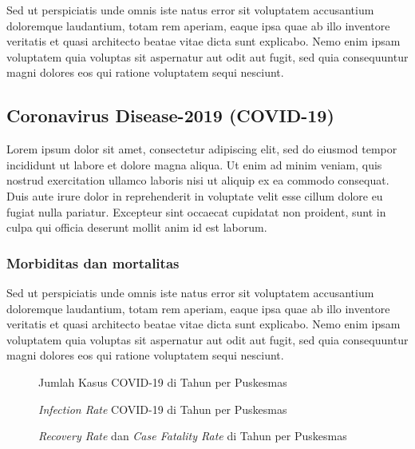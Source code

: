 Sed ut perspiciatis unde omnis iste natus error sit voluptatem accusantium doloremque laudantium, totam rem aperiam, eaque ipsa quae ab illo inventore veritatis et quasi architecto beatae vitae dicta sunt explicabo. Nemo enim ipsam voluptatem quia voluptas sit aspernatur aut odit aut fugit, sed quia consequuntur magni dolores eos qui ratione voluptatem sequi nesciunt.

\subsection{Coronavirus Disease-2019 (COVID-19)}
Lorem ipsum dolor sit amet, consectetur adipiscing elit, sed do eiusmod tempor incididunt ut labore et dolore magna aliqua. Ut enim ad minim veniam, quis nostrud exercitation ullamco laboris nisi ut aliquip ex ea commodo consequat. Duis aute irure dolor in reprehenderit in voluptate velit esse cillum dolore eu fugiat nulla pariatur. Excepteur sint occaecat cupidatat non proident, sunt in culpa qui officia deserunt mollit anim id est laborum.

\subsubsection{Morbiditas dan mortalitas}
Sed ut perspiciatis unde omnis iste natus error sit voluptatem accusantium doloremque laudantium, totam rem aperiam, eaque ipsa quae ab illo inventore veritatis et quasi architecto beatae vitae dicta sunt explicabo. Nemo enim ipsam voluptatem quia voluptas sit aspernatur aut odit aut fugit, sed quia consequuntur magni dolores eos qui ratione voluptatem sequi nesciunt.

\begin{figure}[H]
	\centering
	\caption{Jumlah Kasus COVID-19 di \namaKabupaten Tahun \tP per Puskesmas}
	\label{fig:Kasus-COVID}
\end{figure}

\begin{figure}[H]
	\centering
	\caption{\emph{Infection Rate} COVID-19 di \namaKabupaten Tahun \tP per Puskesmas}
	\label{fig:IR-COVID}
\end{figure}

\begin{figure}[H]
	\centering
	\caption{\emph{Recovery Rate} dan \emph{Case Fatality Rate} di \namaKabupaten Tahun \tP per Puskesmas}
	\label{fig:RR-COVID}
\end{figure}

